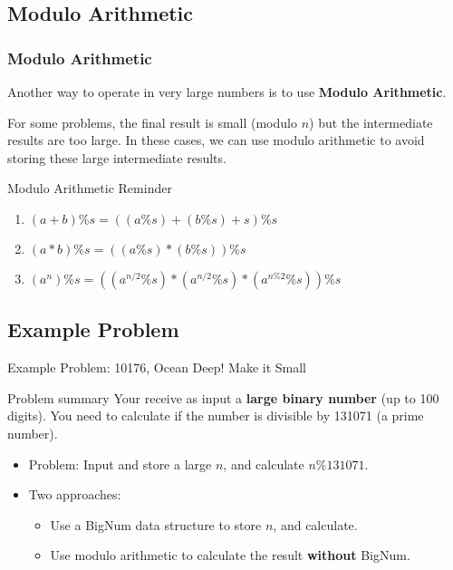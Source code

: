 \subsection{Modulo Arithmetic}
\begin{frame}
  \frametitle{Modulo Arithmetic}

  Another way to operate in very large numbers is to use {\bf Modulo Arithmetic}.\bigskip

  For some problems, the final result is small (modulo $n$) but the intermediate results are too large. In these cases, we can use modulo arithmetic to avoid storing these large intermediate results.\bigskip

  \begin{block}{Modulo Arithmetic Reminder}
    \begin{enumerate}
    \item $(a+b)\%s = ((a\%s)+(b\%s)+s)\%s$
    \item $(a*b)\%s = ((a\%s)*(b\%s))\%s$
    \item $(a^n)\%s = ((a^{n/2}\%s)*(a^{n/2}\%s)*(a^{n\%2}\%s))\%s$
    \end{enumerate}
  \end{block}
\end{frame}

\subsection{Example Problem}
\begin{frame}{Example Problem: 10176, Ocean Deep! Make it Small}
  \begin{block}{Problem summary}
    Your receive as input a {\bf large binary number} (up to 100 digits). You need to calculate if the number is divisible by 131071 (a prime number).
  \end{block}\bigskip

  \begin{itemize}
  \item Problem: Input and store a large $n$, and calculate $n\%131071$.
  \bigskip

  \item Two approaches:
  \begin{itemize}
    \item Use a BigNum data structure to store $n$, and calculate.
    \item Use modulo arithmetic to calculate the result {\bf without} BigNum.
  \end{itemize}

  \end{itemize}
\end{frame}

